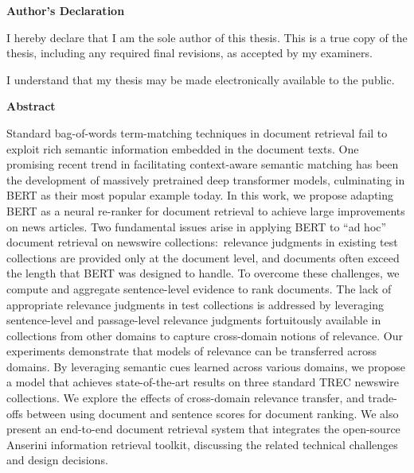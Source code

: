 \cleardoublepage

 \begin{center}\textbf{Author's Declaration}\end{center}
  \noindent
I hereby declare that I am the sole author of this thesis. This is a true copy of the thesis, including any required final revisions, as accepted by my examiners.

  \bigskip
  
  \noindent
I understand that my thesis may be made electronically available to the public.

\cleardoublepage


\begin{center}\textbf{Abstract}\end{center}
Standard bag-of-words term-matching techniques in document retrieval fail to exploit rich semantic information embedded in the document texts.
One promising recent trend in facilitating context-aware semantic matching has been the development of massively pretrained deep transformer models, culminating in BERT as their most popular example today.
In this work, we propose adapting BERT as a neural re-ranker for document retrieval to achieve large improvements on news articles.
Two fundamental issues arise in applying BERT to ``ad hoc'' document retrieval on newswire collections:\
relevance judgments in existing test collections are provided only at the document level, and documents often exceed the length that BERT was designed to handle.
To overcome these challenges, we compute and aggregate sentence-level evidence to rank documents.
The lack of appropriate relevance judgments in test collections is addressed by leveraging sentence-level and passage-level relevance judgments fortuitously available in collections from other domains to capture cross-domain notions of relevance.
Our experiments demonstrate that models of relevance can be transferred across domains.
By leveraging semantic cues learned across various domains, we propose a model that achieves state-of-the-art results on three standard TREC newswire collections.
We explore the effects of cross-domain relevance transfer, and trade-offs between using document and sentence scores for document ranking.
We also present an end-to-end document retrieval system that integrates the open-source Anserini information retrieval toolkit, discussing the related technical challenges and design decisions.


